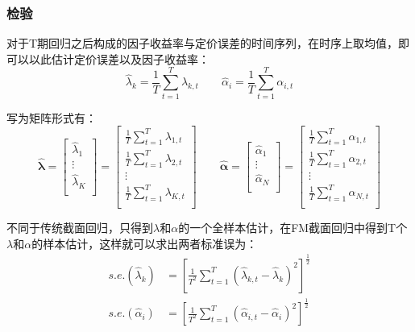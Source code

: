 \documentclass[11pt]{article}
\begin{document}
\subsubsection{检验}

对于T期回归之后构成的因子收益率与定价误差的时间序列，在时序上取均值，即可以以此估计定价误差以及因子收益率：
\begin{equation*}
    \hat{\lambda}_k = \frac{1}{T} \sum_{t=1}^{T} \lambda_{k,t}
    \qquad
    \hat{\alpha}_i = \frac{1}{T} \sum_{t=1}^{T} \alpha_{i,t}
\end{equation*}

写为矩阵形式有：
\begin{equation*}
    \hat{\bm{\lambda}} 
    = \begin{bmatrix} \hat{\lambda}_1 \\ \vdots \\ \hat{\lambda}_K \\ \end{bmatrix}
    = \begin{bmatrix} \frac{1}{T} \sum_{t=1}^{T} \lambda_{1,t} \\ \frac{1}{T} \sum_{t=1}^{T} \lambda_{2,t} \\ \vdots \\ \frac{1}{T} \sum_{t=1}^{T} \lambda_{K,t} \\ \end{bmatrix} 
    \qquad
    \hat{\bm{\alpha}} 
    = \begin{bmatrix} \hat{\alpha}_1 \\ \vdots \\ \hat{\alpha}_N \\ \end{bmatrix}
    = \begin{bmatrix} \frac{1}{T} \sum_{t=1}^{T} \alpha_{1,t} \\ \frac{1}{T} \sum_{t=1}^{T} \alpha_{2,t} \\ \vdots \\ \frac{1}{T} \sum_{t=1}^{T} \alpha_{N,t} \\ \end{bmatrix}
\end{equation*}

不同于传统截面回归，只得到$\lambda$和$\alpha$的一个全样本估计，在FM截面回归中得到T个$\lambda$和$\alpha$的样本估计，这样就可以求出两者标准误为：
\begin{align*}
    s.e.(\hat{\lambda}_k) &= \left[ \frac{1}{T^2} \sum_{t=1}^{T} (\hat{\lambda}_{k,t} - \hat{\lambda}_k)^2 \right]^{\frac{1}{2}} \\
    s.e.(\hat{\alpha}_i) &= \left[ \frac{1}{T^2} \sum_{t=1}^{T} (\hat{\alpha}_{i,t} - \hat{\alpha}_i)^2 \right]^{\frac{1}{2}}
\end{align*}
\end{document}
